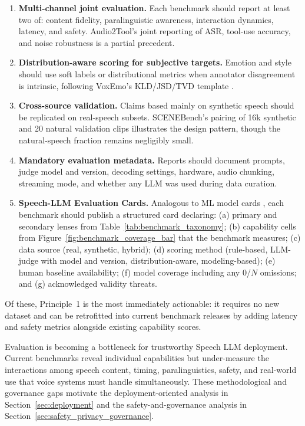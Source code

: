 \begin{enumerate}
  \item \textbf{Multi-channel joint evaluation.} Each benchmark should
  report at least two of: content fidelity, paralinguistic awareness,
  interaction dynamics, latency, and safety. Audio2Tool's joint
  reporting of ASR, tool-use accuracy, and noise robustness
  \citep{pahwa2026audio2tool} is a partial precedent.
  \item \textbf{Distribution-aware scoring for subjective targets.}
  Emotion and style should use soft labels or distributional metrics
  when annotator disagreement is intrinsic, following VoxEmo's
  KLD/JSD/TVD template \citep{zhang2026voxemo}.
  \item \textbf{Cross-source validation.} Claims based mainly on
  synthetic speech should be replicated on real-speech subsets.
  SCENEBench's pairing of 16k synthetic and 20 natural validation
  clips \citep{iyer2026scenebench} illustrates the design pattern,
  though the natural-speech fraction remains negligibly small.
  \item \textbf{Mandatory evaluation metadata.} Reports should
  document prompts, judge model and version, decoding settings,
  hardware, audio chunking, streaming mode, and whether any LLM was
  used during data curation.
  \item \textbf{Speech-LLM Evaluation Cards.} Analogous to ML model
  cards \citep{mitchell2019modelcards}, each benchmark should publish
  a structured card declaring: (a) primary and secondary lenses from
  Table~\ref{tab:benchmark_taxonomy}; (b) capability cells from
  Figure~\ref{fig:benchmark_coverage_bar} that the benchmark measures;
  (c) data source (real, synthetic, hybrid); (d) scoring method
  (rule-based, LLM-judge with model and version, distribution-aware,
  modeling-based); (e) human baseline availability; (f) model
  coverage including any 0/$N$ omissions; and (g) acknowledged
  validity threats.
\end{enumerate}

\noindent Of these, Principle~1 is the most immediately actionable: it
requires no new dataset and can be retrofitted into current benchmark
releases by adding latency and safety metrics alongside existing
capability scores.

Evaluation is becoming a bottleneck for trustworthy Speech LLM
deployment. Current benchmarks reveal individual capabilities but
under-measure the interactions among speech content, timing,
paralinguistics, safety, and real-world use that voice systems must
handle simultaneously. These methodological and governance gaps
motivate the deployment-oriented analysis in
Section~\ref{sec:deployment} and the safety-and-governance analysis in
Section~\ref{sec:safety_privacy_governance}.
\FloatBarrier